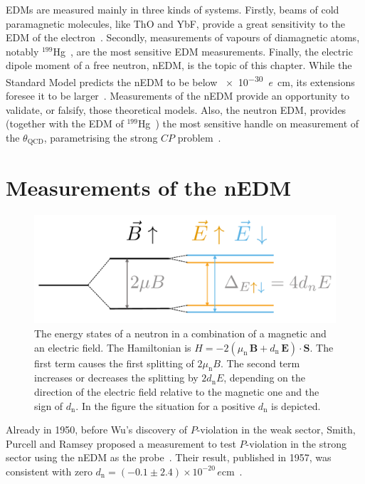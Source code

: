 EDMs are measured mainly in three kinds of systems.
Firstly, beams of cold paramagnetic molecules, like ThO and YbF, provide a great sensitivity to the EDM of the electron~\cite{ThO_eEDM,Hudson2011}.
Secondly, measurements of vapours of diamagnetic atoms, notably $^{199}$Hg~\cite{PhysRevLett.116.161601}, are the most sensitive EDM measurements.
Finally, the electric dipole moment of a free neutron, nEDM, is the topic of this chapter.
While the Standard Model predicts the nEDM to be below \SI{e-30}{\elementarycharge\centi\meter}, its extensions foresee it to be
larger~\cite{Ellis1989}. Measurements of the nEDM provide an opportunity to validate, or falsify, those theoretical models.
Also, the neutron EDM, provides (together with the EDM of ${}^{199}$Hg~\cite{PhysRevLett.116.161601}) the most sensitive handle on measurement of the $\theta_\text{QCD}$, parametrising the strong $CP$ problem~\cite{PDG2016}.



\section{Measurements of the nEDM}

\begin{figure}
  \centering
  \includegraphics[width=0.7\linewidth]{gfx/introduction/measurement_principle.pdf}
  \caption{The energy states of a neutron in a combination of a magnetic and an electric field.
  The Hamiltonian is $H = - 2 \left( \mu_\text{n} \, \mathbf{B} + d_\text{n} \, \mathbf{E} \right ) \cdot \mathbf{S}$.
  The first term causes the first splitting of $2\mu_\text{n} B$.
  The second term increases or decreases the splitting by $2 d_\text{n} E$, depending on the direction of the electric field relative to the magnetic one and the sign of $d_\text{n}$.
  In the figure the situation for a positive $d_\text{n}$ is depicted.}\label{fig:nEDM_measurement_principle}
\end{figure}

Already in 1950, before Wu's discovery of $P$-violation in the weak sector, Smith, Purcell and Ramsey proposed a measurement to test $P$-violation in the strong sector using the nEDM as the probe~\cite{PhysRev.78.807}. Their result, published in 1957, was consistent with zero $d_\text{n} = (-0.1 \pm 2.4) \times 10^{-20}\,\si{\elementarycharge\centi\meter}$~\cite{PhysRev.108.120}.

